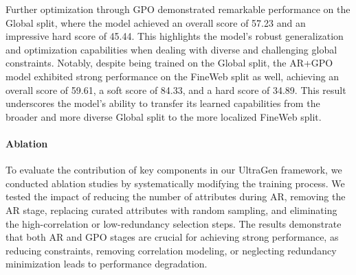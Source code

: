 Further optimization through GPO demonstrated remarkable performance on the Global split, where the model achieved an overall score of 57.23 and an impressive hard score of 45.44. This highlights the model's robust generalization and optimization capabilities when dealing with diverse and challenging global constraints. Notably, despite being trained on the Global split, the AR+GPO model exhibited strong performance on the FineWeb split as well, achieving an overall score of 59.61, a soft score of 84.33, and a hard score of 34.89. This result underscores the model's ability to transfer its learned capabilities from the broader and more diverse Global split to the more localized FineWeb split.

\paragraph{Ablation}
To evaluate the contribution of key components in our UltraGen framework, we conducted ablation studies by systematically modifying the training process. We tested the impact of reducing the number of attributes during AR, removing the AR stage, replacing curated attributes with random sampling, and eliminating the high-correlation or low-redundancy selection steps. The results demonstrate that both AR and GPO stages are crucial for achieving strong performance, as reducing constraints, removing correlation modeling, or neglecting redundancy minimization leads to performance degradation.
